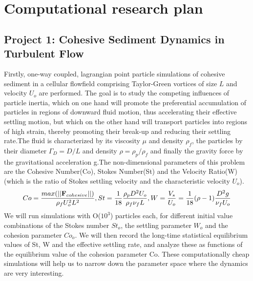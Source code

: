 \documentclass[10pt]{article}
\newcommand{\beq}{\begin{equation}}
\newcommand{\eeq}{ \end{equation} }
\begin{document}


\section{Computational research plan}\label{sec:project_details}
\subsection*{Project 1: Cohesive Sediment Dynamics in Turbulent Flow}
\label{sec:cohesion}
Firstly, one-way coupled, lagrangian point particle simulations of cohesive sediment in a
cellular flowfield comprising Taylor-Green vortices  of size $L$ and velocity $U_o$ are performed. The goal is to study the competing influences of particle inertia, which on one hand will promote the preferential accumulation of particles in regions of downward fluid motion, thus accelerating their effective settling motion, but which on the other hand will transport particles into regions of high strain, thereby promoting their break-up and reducing their settling rate.The fluid is characterized by its viscosity $\mu$ and density $\rho_f$, the particles by their diameter $\Gamma _D  = D/L$ and density $\rho = \rho _p / \rho _f$ and finally the gravity force by the gravitational acceleration g.The non-dimensional parameters of this problem are the Cohesive Number(Co), Stokes Number(St) and the Velocity Ratio(W) (which is the ratio of Stokes settling velocity and the characteristic velocity $U_o$).
\beq
Co = \frac{max(||\mathbf{F}_{cohesive}||)}{\rho _f U_o^2 L^2} ,\\
St= \frac{1}{18}\frac{ \rho_p D^2 U_o}{ \rho_f \nu_f L} ,\\
W = \frac{V_s}{U_o} = \frac{1}{18} (\rho  - 1) \frac{D^2 g}{\nu_f U_o} 
\eeq
  We will run simulations with O($10^3$) particles each, for different initial value combinations of the Stokes number $St_o$, the settling parameter $W_o$ and the cohesion parameter $Co_o$. We will then record the long-time statistical equilibrium values of St, W and the effective settling rate, and analyze these as functions of the equilibrium value of the cohesion parameter Co. These computationally cheap simulations will help us to narrow down the parameter space where the dynamics are very interesting. 
  
\end{document}
